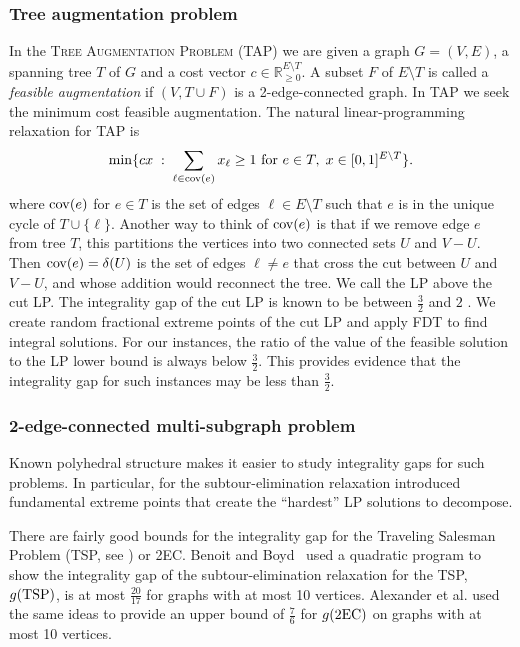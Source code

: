 \subsubsection{Tree augmentation problem}
In the \textsc{Tree Augmentation Problem (TAP)} we are given a  graph $G=(V,E)$, a spanning tree $T$ of $G$ and a cost vector $c\in \mathbb{R}^{E\setminus T}_{\geq 0}$. A subset $F$ of $E\setminus T$ is called a \textit{feasible augmentation} if $(V,T\cup F)$ is a 2-edge-connected graph. In TAP we seek the minimum cost feasible augmentation. The natural linear-programming relaxation for TAP is 
\begin{equation}\label{eq:cutLP}
\min \{cx\; : \; \sum_{\ell \in \mathrm{cov}(e)} x_{\ell} \geq 1 \text{ for } e\in T, \; x\in [0,1]^{E\setminus T}\}.
\end{equation}
where $\mathrm{cov}(e)$ for $e \in T$ is the set of edges $\ell \in E\setminus T$ such that $e$ is in the unique cycle of $T\cup \{\ell\}$. Another way to think of $\mathrm{cov}(e)$ is that if we remove edge $e$ from tree $T$, this partitions the vertices into two connected sets $U$ and $V-U$.  Then $\mathrm{cov}(e) = \delta(U)$ is the set of edges $\ell \neq e$ that cross the cut between $U$ and $V-U$, and whose addition would reconnect the tree. We call the LP above the cut LP. The integrality gap of the cut LP is known to be between $\frac{3}{2}$ \cite{32gaptap} and $2$ \cite{FJ81}. We create random fractional extreme points of the cut LP and apply FDT to find integral solutions. For our instances, the ratio of the value of the feasible solution to the LP lower bound is always below $\frac{3}{2}$. This provides evidence that the integrality gap for such instances may be less than $\frac{3}{2}$.

\subsubsection{2-edge-connected multi-subgraph problem}
\label{sec:2EC-intro}
Known polyhedral structure makes it easier to study integrality gaps for such problems. In particular, for the subtour-elimination relaxation \cite{carrravi,boydcarr,Carr2004} introduced fundamental extreme points that create the ``hardest'' LP solutions to decompose.

There are fairly good bounds for the integrality gap for the Traveling Salesman Problem (TSP, see \cite{tspbook}) or 2EC.
Benoit and Boyd~\cite{TSPcompute} used a quadratic program to show the integrality gap of the subtour-elimination relaxation for the TSP, $g(\operatorname{{{TSP}}})$, is at most $\frac{20}{17}$ for graphs with at most 10 vertices. Alexander et al. \cite{alexander2006integrality} used the same ideas to provide an upper bound of $\frac{7}{6}$ for $g(\2ec)$ on graphs with at most 10 vertices. 

